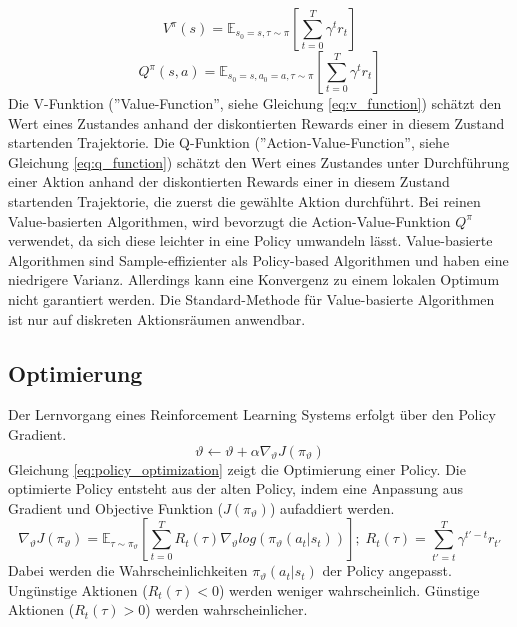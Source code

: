 \begin{equation}
    V^\pi (s)=\mathbb{E}_{s_0=s, \tau \sim \pi} \left[ \sum_{t=0}^T \gamma^t r_t \right]
    \label{eq:v_function}
\end{equation}
\begin{equation}
    Q^\pi (s,a) = \mathbb{E}_{s_0=s,a_0=a,\tau\sim\pi} \left[ \sum_{t=0}^T \gamma^t r_t\right]
    \label{eq:q_function}
\end{equation}
Die V-Funktion (''Value-Function'', siehe Gleichung \ref{eq:v_function}) schätzt den Wert eines Zustandes anhand der diskontierten Rewards einer in diesem Zustand startenden Trajektorie. 
Die Q-Funktion (''Action-Value-Function'', siehe Gleichung \ref{eq:q_function}) schätzt den Wert eines Zustandes unter Durchführung einer Aktion anhand der diskontierten Rewards einer in diesem Zustand startenden Trajektorie, die zuerst die gewählte Aktion durchführt. 
Bei reinen Value-basierten Algorithmen, wird bevorzugt die Action-Value-Funktion $Q^\pi$ verwendet, da sich diese leichter in eine Policy umwandeln lässt. \cite{FoundationsDeepRL}
Value-basierte Algorithmen sind Sample-effizienter als Policy-based Algorithmen und haben eine niedrigere Varianz. Allerdings kann eine Konvergenz zu einem lokalen Optimum nicht garantiert werden. Die Standard-Methode für Value-basierte Algorithmen ist nur auf diskreten Aktionsräumen anwendbar. \cite{}

\subsection{Optimierung}
Der Lernvorgang eines Reinforcement Learning Systems erfolgt über den Policy Gradient.
\begin{equation}
    \vartheta \leftarrow \vartheta + \alpha \nabla_\vartheta J(\pi_\vartheta)
    \label{eq:policy_optimization}
\end{equation}
Gleichung \ref{eq:policy_optimization} zeigt die Optimierung einer Policy. Die optimierte Policy entsteht aus der alten Policy, indem eine Anpassung aus Gradient und Objective Funktion ($J(\pi_\vartheta)$) aufaddiert werden.
\begin{equation}
    \nabla_\vartheta J(\pi_\vartheta) = \mathbb{E}_{\tau\sim\pi_\vartheta} \left[ \sum_{t=0}^T R_t(\tau) \nabla_\vartheta log(\pi_\vartheta(a_t\vert s_t))\right]
    ;\; R_t(\tau) = \sum_{t'=t}^T \gamma^{t'-t} r_{t'}
    \label{eq:gradient_objective_function}
\end{equation}
Dabei werden die Wahrscheinlichkeiten $\pi_\vartheta(a_t\vert s_t)$ der Policy angepasst. Ungünstige Aktionen ($R_t(\tau) < 0$) werden weniger wahrscheinlich. Günstige Aktionen ($R_t(\tau) > 0$) werden wahrscheinlicher. \cite{FoundationsDeepRL}

